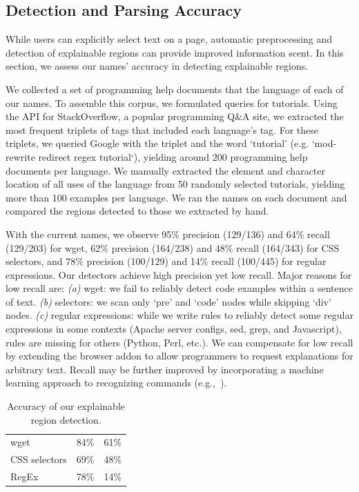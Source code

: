 \subsection{Detection and Parsing Accuracy}
\begin{changes}
While users can explicitly select text on a page, automatic preprocessing and detection of explainable regions can provide improved information scent.
In this section, we assess our \Glspl{name}' accuracy in detecting explainable regions.

We collected a set of programming help documents that the language of each of our \Glspl{name}.
To assemble this corpus, we formulated queries for tutorials.
Using the API for StackOverflow, a popular programming Q\&A site, we extracted the most frequent triplets of tags that included each language's tag.
For these triplets, we queried Google with the triplet and the word `tutorial' (e.g. `mod-rewrite redirect regex tutorial`), yielding around 200 programming help documents per language. %
We manually extracted the element and character location of all uses of the language from 50 randomly selected tutorials, yielding more than 100 examples per language.  We ran the \Glspl{name} on each document and compared the regions detected to those we extracted by hand. 

With the current \Glspl{name}, we observe 95\% precision (129/136) and 64\% recall (129/203) for wget, 62\% precision (164/238) and 48\% recall (164/343) for CSS selectors, and 78\% precision (100/129) and 14\% recall (100/445) for regular expressions.
Our detectors achieve high precision yet low recall.
Major reasons for low recall are:
\emph{(a)} wget: we fail to reliably detect code examples within a sentence of text.
\emph{(b)} selectors: we scan only `pre' and `code' nodes while skipping `div' nodes.
\emph{(c)} regular expressions: while we write rules to reliably detect some regular expressions in some contexts (Apache server configs, sed, grep, and Javascript), rules are missing for others (Python, Perl, etc.).
We can compensate for low recall by extending the browser addon to allow programmers to request explanations for arbitrary text.
Recall may be further improved by incorporating a machine learning approach to recognizing commands (e.g.,~\cite{pavel_browsing_2013}).

\begin{table}
\caption{Accuracy of our explainable region detection.}
\label{tab:detection_accuracy}
\centering
\begin{tabular}{llc}
\toprule
\headrow{Language} & \headrow{Precision} & \headrow{Recall} \\
\midrule
wget & 84\% & 61\% \\ \midrule
CSS selectors & 69\% & 48\% \\ \midrule
RegEx & 78\% & 14\% \\ \bottomrule
\end{tabular}
\end{table}
\fi


\end{changes}
